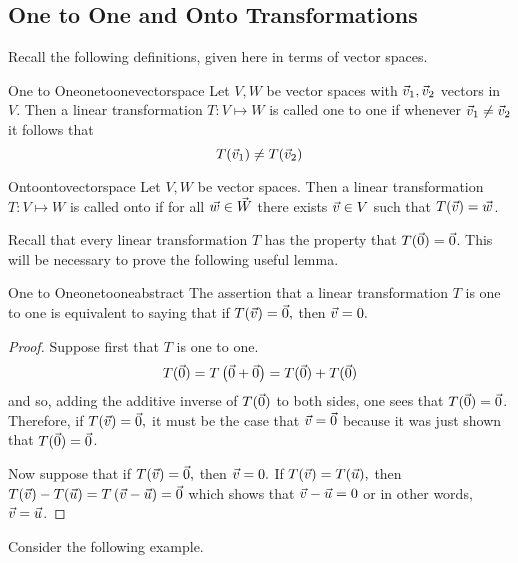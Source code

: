 \subsection{One to One and Onto Transformations}

Recall the following definitions, given here in terms of vector spaces.

\begin{definition}{One to One}{onetoonevectorspace}
Let $V, W$ be vector spaces with $\vec{v}_1, \vec{v}_2$ vectors in $V$. Then a linear transformation $T: V \mapsto W$ is called one to one if whenever $\vec{v}_1 \neq \vec{v}_2$ it follows that 
\[
T(\vec{v}_1) \neq T (\vec{v}_2)
\]
\end{definition}

\begin{definition}{Onto}{ontovectorspace}
Let $V, W$ be vector spaces. Then a linear transformation $T: V \mapsto W$ is called onto if for all $\vec{w} \in \vec{W}$ there exists $\vec{v} \in V$ such that $T(\vec{v}) = \vec{w}$. 
\end{definition}

Recall that every linear transformation $T$ has the property that $T(\vec{0})=\vec{0}$. This will be necessary to prove the following useful lemma. 

\begin{lemma}{One to One}{onetooneabstract}
The assertion that a linear transformation $T$ is one to one is equivalent to
saying that if $T(\vec{v})=\vec{0},$ then $\vec{v}=0.$ 
\end{lemma}

\begin{proof}
Suppose first that $T$ is one to one. 
\begin{equation*}
T(\vec{0})=T\left( \vec{0}+\vec{0}\right) =T(\vec{0})+T(\vec{0})
\end{equation*}
and so, adding the additive inverse of $T(\vec{0})$ to both sides, one sees
that $T(\vec{0})=\vec{0}$. Therefore, if $T(\vec{v})=\vec{0},$ it must be the
case that $\vec{v}=\vec{0}$ because it was just shown that $T(\vec{0})=\vec{0}$.

Now suppose that if $T(\vec{v})=\vec{0},$ then $\vec{v}=0.$ If $T(\vec{v})=T(\vec{u}),$ then $T(\vec{v})-T(\vec{u})=T\left( \vec{v}-\vec{u}\right) =\vec{0}$ which
shows that $\vec{v}-\vec{u}=0$ or in other words, $\vec{v}=\vec{u}$. 
\end{proof}

Consider the following example.

